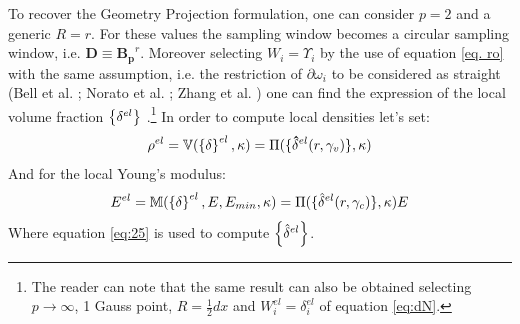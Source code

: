  To recover the Geometry Projection formulation, one can consider $p=2$ and a generic $R=r$. For these values the sampling window becomes a circular sampling window, i.e. $\mathbf{D}\equiv\mathbf{B_p}^r$. Moreover selecting $W_i=\Upsilon_i$ by the use of equation \eqref{eq. ro} with the same assumption, i.e. the restriction of $\partial \omega_i$ to be considered as straight (Bell et al. \cite{bell2012geometry}; Norato et al. \cite{norato2015geometry}; Zhang et al. \cite{zhang2016geometry}) one can find the expression of the local volume fraction $\left\{{\delta^{el}}\right\}$ .\footnote{The reader can note that the same result can also be obtained selecting $p\to \infty$, 1 Gauss point, $R=\frac{1}{2}dx$ and $W_i^{el}={\delta}_i^{el}$ of equation \eqref{eq:dN}. } In order to compute local densities let's set:
  \begin{equation}
     \rho^{el}=\mathbb{V}(\left\{{\delta}\right\}^{el},\kappa)=\Pi(\lbrace\mathbf{\hat{\delta}}^{el}( r,\gamma_v )\rbrace,\kappa) 
 \end{equation}
 And for the local Young's modulus:
  \begin{equation}
 E^{el}=\mathbb{M}(\left\{{\delta}\right\}^{el},E,E_{min},\kappa)=\Pi(\lbrace{\hat{\delta}}^{el}(r,\gamma_c )\rbrace,\kappa) E
  \end{equation}
  Where equation \eqref{eq:25} is used to compute $\left\{{\hat{\delta}^{el}}\right\}$.
 
